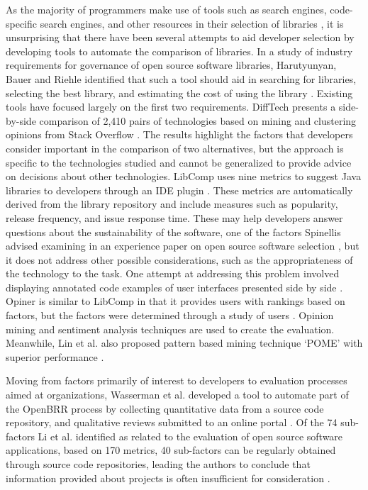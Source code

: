As the majority of programmers make use of tools such as search engines, code-specific search engines, and other resources in their selection of libraries \cite{umarji2008archetypal}, it is unsurprising that there have been several attempts to aid developer selection by developing tools to automate the comparison of libraries. In a study of industry requirements for governance of open source software libraries, Harutyunyan, Bauer and Riehle identified that such a tool should aid in searching for libraries, selecting the best library, and estimating the cost of using the library \cite{harutyunyan:2018:understanding}. Existing tools have focused largely on the first two requirements. DiffTech presents a side-by-side comparison of 2,410 pairs of technologies based on mining and clustering opinions from Stack Overflow \cite{huang2018tell, wang2020difftech, wang2021difftech}. The results highlight the factors that developers consider important in the comparison of two alternatives, but the approach is specific to the technologies studied and cannot be generalized to provide advice on decisions about other technologies. LibComp uses nine metrics to suggest Java libraries to developers through an IDE plugin \cite{de2018library, de2018empirical, el2020libcomp}. These metrics are automatically derived from the library repository and include measures such as popularity, release frequency, and issue response time. These may help developers answer questions about the sustainability of the software, one of the factors Spinellis advised examining in an experience paper on open source software selection \cite{spinellis2019select}, but it does not address other possible considerations, such as the appropriateness of the technology to the task. One attempt at addressing this problem involved displaying annotated code examples of user interfaces presented side by side \cite{yan2022concept}. Opiner is similar to LibComp in that it provides users with rankings based on factors, but the factors were determined through a study of users \cite{uddin2019automatic, uddin2022empirical}. Opinion mining and sentiment analysis techniques are used to create the evaluation. Meanwhile, Lin et al. also proposed pattern based mining technique `POME' with superior performance \cite{lin2019pattern}.   

Moving from factors primarily of interest to developers to evaluation processes aimed at organizations, Wasserman et al. developed a tool to automate part of the OpenBRR process by collecting quantitative data from a source code repository, and qualitative reviews submitted to an online portal \cite{wasserman2017osspal}. Of the 74 sub-factors Li et al. identified as related to the evaluation of open source software applications, based on 170 metrics, 40 sub-factors can be regularly obtained through source code repositories, leading the authors to conclude that information provided about projects is often insufficient for consideration \cite{li2022exploring}.



